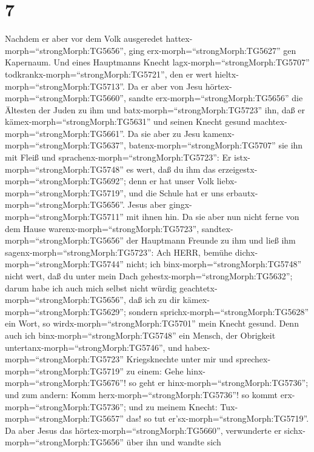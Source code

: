 \hypertarget{section-6}{%
\section{7}\label{section-6}}

 Nachdem er aber vor dem Volk ausgeredet
hattex-morph=``strongMorph:TG5656'', ging
erx-morph=``strongMorph:TG5627'' gen Kapernaum.  Und eines
Hauptmanns Knecht lagx-morph=``strongMorph:TG5707''
todkrankx-morph=``strongMorph:TG5721'', den er wert
hieltx-morph=``strongMorph:TG5713''.  Da er aber von Jesu
hörtex-morph=``strongMorph:TG5660'', sandte
erx-morph=``strongMorph:TG5656'' die Ältesten der Juden zu ihm und
batx-morph=``strongMorph:TG5723'' ihn, daß er
kämex-morph=``strongMorph:TG5631'' und seinen Knecht gesund
machtex-morph=``strongMorph:TG5661''.  Da sie aber zu Jesu
kamenx-morph=``strongMorph:TG5637'', batenx-morph=``strongMorph:TG5707''
sie ihn mit Fleiß und sprachenx-morph=``strongMorph:TG5723'': Er
istx-morph=``strongMorph:TG5748'' es wert, daß du ihm das
erzeigestx-morph=``strongMorph:TG5692'';  denn er hat unser
Volk liebx-morph=``strongMorph:TG5719'', und die Schule hat er uns
erbautx-morph=``strongMorph:TG5656''.  Jesus aber
gingx-morph=``strongMorph:TG5711'' mit ihnen hin. Da sie aber nun nicht
ferne von dem Hause warenx-morph=``strongMorph:TG5723'',
sandtex-morph=``strongMorph:TG5656'' der Hauptmann Freunde zu ihm und
ließ ihm sagenx-morph=``strongMorph:TG5723'': Ach HERR, bemühe
dichx-morph=``strongMorph:TG5744'' nicht; ich
binx-morph=``strongMorph:TG5748'' nicht wert, daß du unter mein Dach
gehestx-morph=``strongMorph:TG5632'';  darum habe ich auch
mich selbst nicht würdig geachtetx-morph=``strongMorph:TG5656'', daß ich
zu dir kämex-morph=``strongMorph:TG5629''; sondern
sprichx-morph=``strongMorph:TG5628'' ein Wort, so
wirdx-morph=``strongMorph:TG5701'' mein Knecht gesund.  Denn
auch ich binx-morph=``strongMorph:TG5748'' ein Mensch, der Obrigkeit
untertanx-morph=``strongMorph:TG5746'', und
habex-morph=``strongMorph:TG5723'' Kriegsknechte unter mir und
sprechex-morph=``strongMorph:TG5719'' zu einem: Gehe
hinx-morph=``strongMorph:TG5676''! so geht er
hinx-morph=``strongMorph:TG5736''; und zum andern: Komm
herx-morph=``strongMorph:TG5736''! so kommt
erx-morph=``strongMorph:TG5736''; und zu meinem Knecht:
Tux-morph=``strongMorph:TG5657'' das! so tut
er'sx-morph=``strongMorph:TG5719''.  Da aber Jesus das
hörtex-morph=``strongMorph:TG5660'', verwunderte er
sichx-morph=``strongMorph:TG5656'' über ihn und wandte sich
